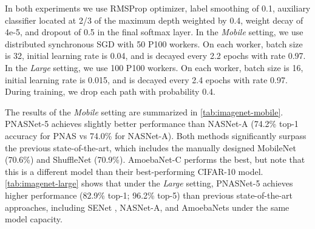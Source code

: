 \documentclass[runningheads]{llncs}
\begin{document}
In both experiments we use RMSProp optimizer, label smoothing of 0.1, auxiliary classifier located at 2/3 of the maximum depth weighted by 0.4, weight decay of 4e-5,
and dropout of 0.5 in the final softmax layer.
In the \textit{Mobile} setting, we use distributed synchronous SGD with 50 P100 workers.
On each worker, batch size is 32, initial learning rate is 0.04, and is decayed every 2.2 epochs with rate 0.97.
In the \textit{Large} setting, we use 100 P100 workers.
On each worker, batch size is 16, initial learning rate is 0.015, and is decayed every 2.4 epochs with rate 0.97.
During training, we drop each path with probability 0.4.



The results of the \textit{Mobile} setting are summarized in \cref{tab:imagenet-mobile}.
PNASNet-5 achieves slightly better performance than NASNet-A (74.2\% top-1 accuracy for PNAS vs 74.0\% for NASNet-A).
Both methods significantly surpass
the previous state-of-the-art,
which includes the manually
designed MobileNet \cite{DBLP:journals/corr/HowardZCKWWAA17} (70.6\%)
and ShuffleNet \cite{DBLP:journals/corr/ZhangZLS17} (70.9\%).
AmoebaNet-C performs the best, but note that this is a different model than their best-performing CIFAR-10 model.
\cref{tab:imagenet-large} shows that under the \textit{Large} setting, PNASNet-5 achieves higher performance (82.9\% top-1; 96.2\% top-5) than previous state-of-the-art approaches,
including SENet \cite{DBLP:journals/corr/abs-1709-01507}, NASNet-A, and AmoebaNets under the same model capacity.
\end{document}
